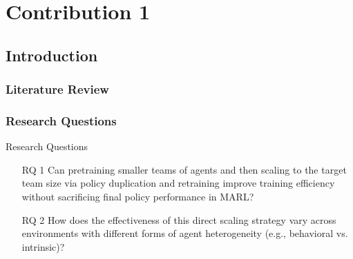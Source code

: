 \section{Contribution 1}


\subsection{Introduction}

\begin{frame}
\end{frame}

\subsubsection{Literature Review}

\subsubsection{Research Questions}

\begin{frame}{Research Questions}
    \begin{enumerate}
        \item[RQ 1] {
            Can pretraining smaller teams of agents and then scaling to the target 
            team size via policy duplication and retraining improve training efficiency 
            without sacrificing final policy performance in MARL?}
        \item[RQ 2] {
            How does the effectiveness of this direct scaling strategy vary across 
            environments with different forms of agent heterogeneity 
            (e.g., behavioral vs. intrinsic)?}
    \end{enumerate}
\end{frame}

